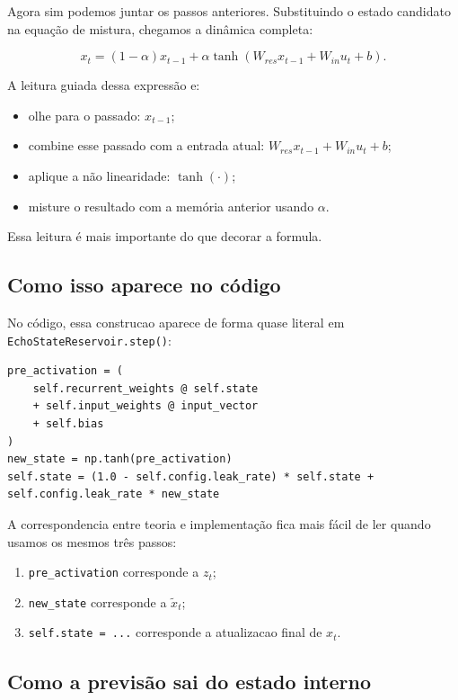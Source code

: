 \documentclass[12pt]{article}
\providecommand{\tightlist}{%
              \setlength{\itemsep}{0pt}\setlength{\parskip}{0pt}}
\begin{document}
Agora sim podemos juntar os passos anteriores. Substituindo o estado candidato na equação de mistura, chegamos a dinâmica completa:

\[
x_t = (1 - \alpha) x_{t-1} + \alpha \tanh(W_{res} x_{t-1} + W_{in} u_t + b).
\]

A leitura guiada dessa expressão e:

\begin{itemize}
\tightlist
\item
  olhe para o passado: \(x_{t-1}\);
\item
  combine esse passado com a entrada atual: \(W_{res} x_{t-1} + W_{in} u_t + b\);
\item
  aplique a não linearidade: \(\tanh(\cdot)\);
\item
  misture o resultado com a memória anterior usando \(\alpha\).
\end{itemize}

Essa leitura é mais importante do que decorar a formula.

\subsection{Como isso aparece no código}\label{38-como-isso-aparece-no-cuxf3digo}

No código, essa construcao aparece de forma quase literal em \texttt{EchoStateReservoir.step()}:

\begin{verbatim}
pre_activation = (
    self.recurrent_weights @ self.state
    + self.input_weights @ input_vector
    + self.bias
)
new_state = np.tanh(pre_activation)
self.state = (1.0 - self.config.leak_rate) * self.state + self.config.leak_rate * new_state
\end{verbatim}

A correspondencia entre teoria e implementação fica mais fácil de ler quando usamos os mesmos três passos:

\begin{enumerate}
\def\labelenumi{\arabic{enumi}.}
\tightlist
\item
  \texttt{pre\_activation} corresponde a \(z_t\);
\item
  \texttt{new\_state} corresponde a \(\widetilde{x}_t\);
\item
  \texttt{self.state\ =\ ...} corresponde a atualizacao final de \(x_t\).
\end{enumerate}

\subsection{Como a previsão sai do estado interno}\label{39-como-a-previsuxe3o-sai-do-estado-interno}
\end{document}

